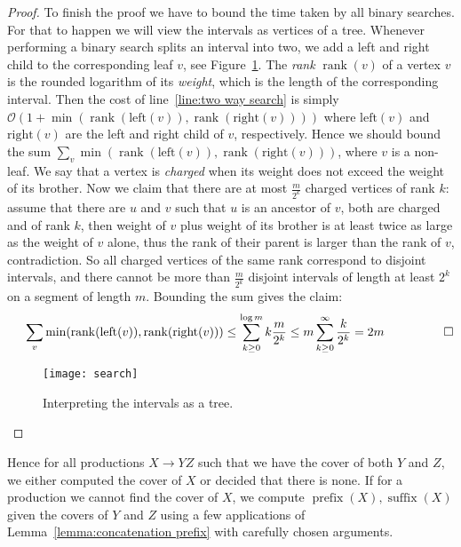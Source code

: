 \documentclass[runningheads]{llncs}
\DeclareMathOperator{\prefix}{prefix}
\DeclareMathOperator{\suffix}{suffix}
\DeclareMathOperator{\rank}{rank}
\begin{document}
\begin{proof}
To finish the proof we have to bound the time taken by all binary searches. For that to happen we will view the intervals as vertices of a tree. Whenever performing a binary search splits an interval into two, we add a left and right child to the corresponding leaf $v$, see Figure~\ref{figure:search}. The {\it rank} $\rank(v)$ of a vertex $v$ is the rounded logarithm of its {\it weight}, which is the length of the corresponding interval. Then the cost of line~\ref{line:two way search} is simply $\mathcal{O}(1+\min(\rank(\text{left}(v)),\rank(\text{right}(v))))$ where $\text{left}(v)$ and $\text{right}(v)$ are the left and right child of $v$, respectively. Hence we should bound the sum $\sum_{v} \min(\rank(\text{left}(v)),\rank(\text{right}(v)))$, where $v$ is a non-leaf. We say that a vertex is {\it charged} when its weight does not exceed the weight of its brother. Now we claim that there are at most $\frac{m}{2^k}$ charged vertices of rank $k$: assume that there are $u$ and $v$ such that $u$ is an ancestor of $v$, both are charged and of rank $k$, then weight of $v$ plus weight of its brother is at least twice as large as the weight of $v$ alone, thus the rank of their parent is larger than the rank of $v$, contradiction. So all charged vertices of the same rank correspond to disjoint intervals, and there cannot be more than $\frac{m}{2^k}$ disjoint intervals of length at least $2^k$ on a segment of length $m$. Bounding the sum gives the claim:
\vspace{-0.3cm}
$$\hspace{0.5cm}\sum_{v} \min(\rank(\text{left}(v)),\rank(\text{right}(v))) \leq \sum_{k\geq 0}^{\log m} k\frac{m}{2^k} \leq m\sum_{k\geq 0}^{\infty}\frac{k}{2^k}=2m\hspace{1cm}\qed$$
\vspace{-0.7cm}
\begin{figure}
\centering
\texttt{[image: search]}
\caption{Interpreting the intervals as a tree.}
\vspace{-0.6cm}
\label{figure:search}
\end{figure}
\end{proof}

Hence for all productions $X\rightarrow YZ$ such that we have the cover of both $Y$ and $Z$, we either computed the cover of $X$ or decided that there is none. If for a production we cannot find the cover of $X$, we compute $\prefix(X), \suffix(X)$ given the covers of $Y$ and $Z$
using a few applications of  Lemma~\ref{lemma:concatenation prefix} with carefully chosen arguments.
\end{document}
